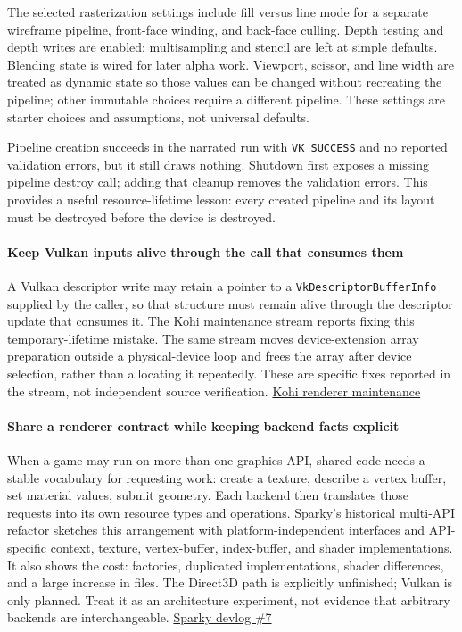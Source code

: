 The selected rasterization settings include fill versus line mode for a separate wireframe pipeline, front-face winding, and back-face culling. Depth testing and depth writes are enabled; multisampling and stencil are left at simple defaults. Blending state is wired for later alpha work. Viewport, scissor, and line width are treated as dynamic state so those values can be changed without recreating the pipeline; other immutable choices require a different pipeline. These settings are starter choices and assumptions, not universal defaults.

Pipeline creation succeeds in the narrated run with \texttt{VK\_SUCCESS} and no reported validation errors, but it still draws nothing. Shutdown first exposes a missing pipeline destroy call; adding that cleanup removes the validation errors. This provides a useful resource-lifetime lesson: every created pipeline and its layout must be destroyed before the device is destroyed.

\paragraph{Keep Vulkan inputs alive through the call that consumes them}\label{keep-vulkan-inputs-alive-through-the-call-that-consumes-them}

A Vulkan descriptor write may retain a pointer to a \texttt{VkDescriptorBufferInfo} supplied by the caller, so that structure must remain alive through the descriptor update that consumes it. The Kohi maintenance stream reports fixing this temporary-lifetime mistake. The same stream moves device-extension array preparation outside a physical-device loop and frees the array after device selection, rather than allocating it repeatedly. These are specific fixes reported in the stream, not independent source verification. \href{https://www.youtube.com/watch?v=x8ao57nbMlY}{Kohi renderer maintenance}

\paragraph{Share a renderer contract while keeping backend facts explicit}\label{share-a-renderer-contract-while-keeping-backend-facts-explicit}

When a game may run on more than one graphics API, shared code needs a stable vocabulary for requesting work: create a texture, describe a vertex buffer, set material values, submit geometry. Each backend then translates those requests into its own resource types and operations. Sparky's historical multi-API refactor sketches this arrangement with platform-independent interfaces and API-specific context, texture, vertex-buffer, index-buffer, and shader implementations. It also shows the cost: factories, duplicated implementations, shader differences, and a large increase in files. The Direct3D path is explicitly unfinished; Vulkan is only planned. Treat it as an architecture experiment, not evidence that arbitrary backends are interchangeable. \href{https://www.youtube.com/watch?v=yGggmfDGGv0&t=2m43s}{Sparky devlog \#7}

